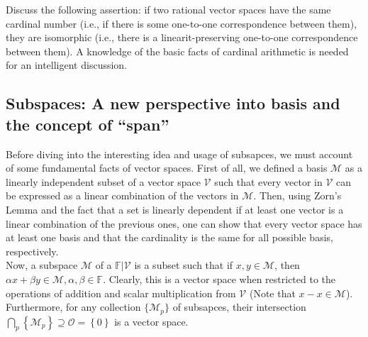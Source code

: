 \documentclass[12pt]{article}
\newenvironment{problem}[2][Problem]{\begin{trivlist} \item[\hskip \labelsep {\bfseries #1}\hskip \labelsep {\bfseries #2.}]}{\end{trivlist}}
\newenvironment{solution}[1][Solution]{\begin{trivlist} \item[\hskip \labelsep {\bfseries #1}]}{\end{trivlist}}
\begin{document}
\begin{problem}{4}
  Discuss the following assertion: if two rational vector spaces have the same cardinal number (i.e., if there is some one-to-one correspondence between them), they are isomorphic (i.e., there is a linearit-preserving one-to-one correspondence between them). A knowledge of the basic facts of cardinal arithmetic is needed for an intelligent discussion.
\begin{solution}
  
\end{solution}
\end{problem}

\subsection{Subspaces: A new perspective into basis and the concept of ``span''}

Before diving into the interesting idea and usage of subsapces, we must account of some fundamental facts of vector spaces. First of all, we defined a basis $\mathcal{M}$ as a linearly independent subset of a vector space $\mathcal{V}$ such that every vector in $\mathcal{V}$ can be expressed as a linear combination of the vectors in $\mathcal{M}$. Then, using Zorn's Lemma and the fact that a set is linearly dependent if at least one vector is a linear combination of the previous ones, one can show that every vector space has at least one basis and that the cardinality is the same for all possible basis, respectively.\\

Now, a subspace $\mathcal{M}$ of a $\mathbb{F}|\mathcal{V}$ is a subset such that if $x,y\in \mathcal{M}$, then $\alpha x+\beta y\in \mathcal{M}, \alpha,\beta\in \mathbb{F}$. Clearly, this is a vector space when restricted to the operations of addition and scalar multiplication from $\mathcal{V}$ (Note that $x-x\in \mathcal{M}$). Furthermore, for any collection $\{\mathcal{M}_{p}\}$ of subsapces, their intersection $\bigcap_{p}\left\{ \mathcal{M}_{p} \right\}\supseteq \mathcal{O}=\left\{ 0 \right\}$ is a vector space.\\
\end{document}
